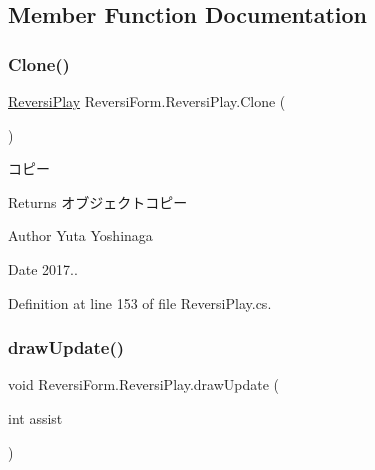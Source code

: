 \subsection{Member Function Documentation}
\mbox{\label{class_reversi_form_1_1_reversi_play_aae235e59005e054773bcf1bc0177d34a}} 
\subsubsection{\texorpdfstring{Clone()}{Clone()}}
{\footnotesize\ttfamily \hyperlink{class_reversi_form_1_1_reversi_play}{Reversi\+Play} Reversi\+Form.\+Reversi\+Play.\+Clone (\begin{DoxyParamCaption}{ }\end{DoxyParamCaption})}



コピー 

\begin{DoxyReturn}{Returns}
オブジェクトコピー 
\end{DoxyReturn}
\begin{DoxyAuthor}{Author}
Yuta Yoshinaga 
\end{DoxyAuthor}
\begin{DoxyDate}{Date}
2017.. 
\end{DoxyDate}


Definition at line 153 of file Reversi\+Play.\+cs.

\mbox{\label{class_reversi_form_1_1_reversi_play_af1415f15759ba8475b4b5afca3a35017}} 
\subsubsection{\texorpdfstring{draw\+Update()}{drawUpdate()}}
{\footnotesize\ttfamily void Reversi\+Form.\+Reversi\+Play.\+draw\+Update (\begin{DoxyParamCaption}\item[{int}]{assist }\end{DoxyParamCaption})}



